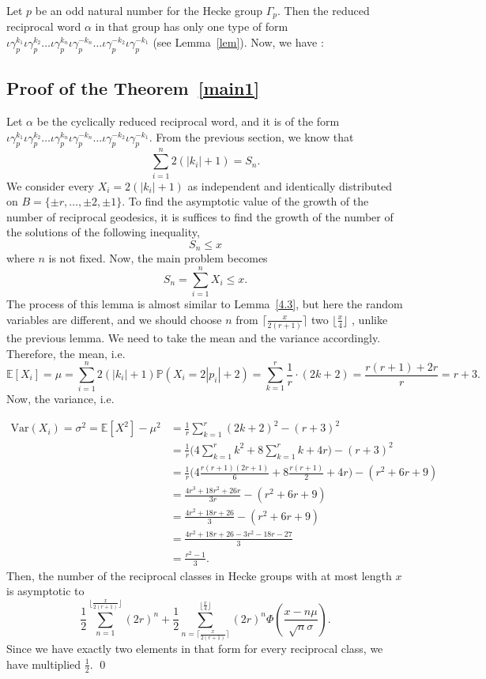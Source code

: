 \documentclass[11pt]{amsart}
\numberwithin{equation}{section}
\newcommand{\g}{\gamma_{p}}
\newcommand{\io}{\iota }
\newcommand{\thmref}[1]{Theorem~\ref{#1}}
\newcommand{\lemref}[1]{Lemma~\ref{#1}}
\numberwithin{equation}{section}
\begin{document}
		Let $p$ be an odd natural number for the Hecke group $\Gamma_{p}$. Then the reduced reciprocal word $\alpha$ in that group has only one type of form $ \io\g^{k_{1}}\io \g^{k_{2}}\dots \io \g^{k_{n}}\io \g^{-k_{n}}\dots\io \g^{-k_{2}}\io \g^{-k_{1}} $ (see \lemref{lem}). Now, we have :
	
		\subsection{Proof of the \thmref{main1}}
		Let $\alpha$ be the cyclically reduced reciprocal word, and it is of the form $ \io\g^{k_{1}}\io \g^{k_{2}}\dots \io \g^{k_{n}}\io \g^{-k_{n}}\dots\io \g^{-k_{2}}\io \g^{-k_{1}} .$
			From the previous section, we know that \[\sum_{i=1}^{n}2\left(\left|k_{i}\right|+1\right)=S_{n}.\]
			We consider every $X_{i}=2\left(\left|k_{i}\right|+1\right)$ as independent and identically distributed on $B=\{\pm r,\dots, \pm2,\pm 1\}.$ To find the asymptotic value of the growth of the number of reciprocal geodesics, it is suffices to find the growth of the number of the solutions of the following inequality,
            \[ S_n\leq x\]
            where $n$ is not fixed.
		Now, the main problem becomes $$S_{n}=\sum_{i=1}^{n}X_{i}\leq x.$$ The process of this lemma is almost similar to \lemref{4.3}, but here the random variables are different, and we should choose $n$ from $\lceil\frac{x}{2(r+1)}\rceil$ two $\lfloor\frac{x}{4}\rfloor$ , unlike the previous lemma.  We need to take the mean and the variance accordingly. 
		Therefore, the mean, i.e.	\[
		\mathbb{E}[X_i] = \mu = \sum_{i=1}^{n}2(\left|k_{i}\right|+1)\mathbb{P}(X_{i}=2\left|p_{i}\right|+2)=\sum_{k=1}^{r} \frac{1}{r}\cdot (2k +2)=\frac{r(r+1)+2r}{r}=r+3.
		\]
			Now, the variance, i.e.
			
			\begin{align*}
				\mathrm{Var}(X_i) = \sigma^2 = \mathbb{E}[X^{2}]-\mu^{2}
				&= \frac{1}{r}\sum_{k=1}^r (2k+2)^2 - (r+3)^2 \\[6pt]
				&= \frac{1}{r}\Biggl(4\sum_{k=1}^r k^2 + 8\sum_{k=1}^r k + 4r\Biggr) - (r+3)^2 \\[6pt]
				&= \frac{1}{r}\Biggl(4\frac{r(r+1)(2r+1)}{6} + 8\frac{r(r+1)}{2} + 4r\Biggr) - (r^2+6r+9) \\[6pt]
				&= \frac{4r^3 + 18r^2 + 26r}{3r} - (r^2+6r+9) \\[6pt]
				&= \frac{4r^2 + 18r + 26}{3} - (r^2+6r+9) \\[6pt]
				&= \frac{4r^2 + 18r + 26 - 3r^2 - 18r - 27}{3} \\[6pt]
				&= \frac{r^2 - 1}{3}.
			\end{align*}
			 Then, the number of the reciprocal classes in Hecke groups with at most length $x$ is asymptotic to
			 	\[\frac{1}{2}\sum_{n=1}^{\lfloor \frac{x}{2(r+1)}\rfloor}(2r)^{n}+\frac{1}{2}{\sum_{n=\lceil \frac{x}{2(r+1)}\rceil}^{\lfloor \frac{x}{4}\rfloor}(2r)^{n}\Phi\left(\frac{x-n\mu}{\sqrt{n}\sigma}\right)} .\] Since we have exactly two elements in that form for every reciprocal class, we have multiplied $\frac{1}{2}$.			 \qed
	
\end{document}
